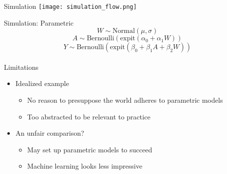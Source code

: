 \documentclass{beamer}
\begin{document}
\begin{frame}{Simulation}
	\centering
	\texttt{[image: simulation\_flow.png]}
\end{frame}

\begin{frame}{Simulation: Parametric}
	\[W \sim \text{Normal}(\mu, \sigma)\]
	\[A \sim \text{Bernoulli}(\text{expit}(\alpha_0 + \alpha_1 W))\]
	\[Y \sim \text{Bernoulli}(\text{expit}(\beta_0 + \beta_1 A + \beta_2 W))\]
	~\\
	Limitations
	\begin{itemize}
		\item Idealized example 
		\begin{itemize}
			\item No reason to presuppose the world adheres to parametric models
			\item Too abstracted to be relevant to practice
		\end{itemize}
		\item An unfair comparison?
		\begin{itemize}
			\item May set up parametric models to succeed
			\item Machine learning looks less impressive
		\end{itemize}
	\end{itemize}
\end{frame}
\end{document}
